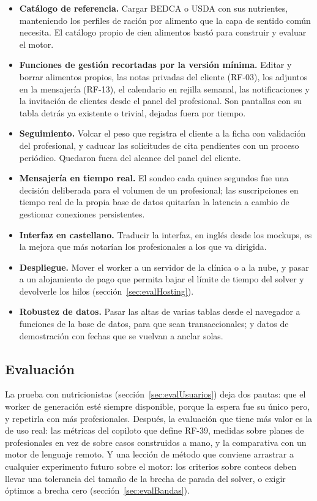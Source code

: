 \begin{itemize}
    \item \textbf{Catálogo de referencia.} Cargar BEDCA o USDA con sus nutrientes, manteniendo los perfiles de ración por alimento que la capa de sentido común necesita. El catálogo propio de cien alimentos bastó para construir y evaluar el motor.
    \item \textbf{Funciones de gestión recortadas por la versión mínima.} Editar y borrar alimentos propios, las notas privadas del cliente (RF-03), los adjuntos en la mensajería (RF-13), el calendario en rejilla semanal, las notificaciones y la invitación de clientes desde el panel del profesional. Son pantallas con su tabla detrás ya existente o trivial, dejadas fuera por tiempo.
    \item \textbf{Seguimiento.} Volcar el peso que registra el cliente a la ficha con validación del profesional, y caducar las solicitudes de cita pendientes con un proceso periódico. Quedaron fuera del alcance del panel del cliente.
    \item \textbf{Mensajería en tiempo real.} El sondeo cada quince segundos fue una decisión deliberada para el volumen de un profesional; las suscripciones en tiempo real de la propia base de datos quitarían la latencia a cambio de gestionar conexiones persistentes.
    \item \textbf{Interfaz en castellano.} Traducir la interfaz, en inglés desde los mockups, es la mejora que más notarían los profesionales a los que va dirigida.
    \item \textbf{Despliegue.} Mover el worker a un servidor de la clínica o a la nube, y pasar a un alojamiento de pago que permita bajar el límite de tiempo del solver y devolverle los hilos (sección~\ref{sec:evalHosting}).
    \item \textbf{Robustez de datos.} Pasar las altas de varias tablas desde el navegador a funciones de la base de datos, para que sean transaccionales; y datos de demostración con fechas que se vuelvan a anclar solas.
\end{itemize}

\subsection{Evaluación}
\label{sec:futuroEvaluacion}

La prueba con nutricionistas (sección~\ref{sec:evalUsuarios}) deja dos pautas: que el worker de generación esté siempre disponible, porque la espera fue su único pero, y repetirla con más profesionales. Después, la evaluación que tiene más valor es la de uso real: las métricas del copiloto que define RF-39, medidas sobre planes de profesionales en vez de sobre casos construidos a mano, y la comparativa con un motor de lenguaje remoto. Y una lección de método que conviene arrastrar a cualquier experimento futuro sobre el motor: los criterios sobre conteos deben llevar una tolerancia del tamaño de la brecha de parada del solver, o exigir óptimos a brecha cero (sección~\ref{sec:evalBandas}).

